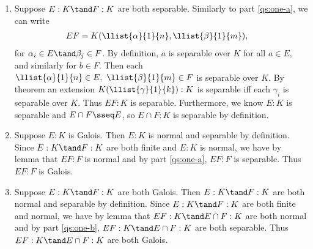 \documentclass{article}
\begin{document}
\begin{enumerate}[label=(\alph*)]
  \item \label{qs:one-b} \begin{solution}
    Suppose \( E:K\tand F:K \) are both separable.
    Similarly to part \ref{qs:one-a}, we can write \begin{align*}
      EF &= K(\llist{\alpha}{1}{n},\llist{\beta}{1}{m}),
    \end{align*}
    for \( \alpha_i\in E \tand \beta_j\in F \).
    By definition, \( a \) is separable over \( K \) for all \( a\in E \), and similarly for \( b\in F \).
    Then each \( \llist{\alpha}{1}{n}\in E,\ \llist{\beta}{1}{m}\in F \) is separable over \( K \).
    By theorem an extension \( K(\llist{\gamma}{1}{k}):K \) is separable iff each \( \gamma_i \) is separable over \( K \).
    Thus \( EF:K \) is separable.
    Furthermore, we know \( E:K \) is separable and \( E\cap F\sseq E \), so \( E\cap F:K \) is separable by definition.
  \end{solution}

  \item \begin{solution}
    Suppose \( E:K \) is Galois.
    Then \( E:K \) is normal and separable by definition.
    Since \( E:K\tand F:K \) are both finite and \( E:K \) is normal, we have by lemma that \( EF:F \) is normal and by part \ref{qs:one-a}, \( EF:F \) is separable.
    Thus \( EF:F \) is Galois.
  \end{solution}

  \item \begin{solution}
    Suppose \( E:K\tand F:K \) are both Galois.
    Then \( E:K\tand F:K \) are both normal and separable by definition.
    Since \( E:K\tand F:K \) are both finite and normal, we have by lemma that \( EF:K \tand  E\cap F:K \) are both normal and by part \ref{qs:one-b}, \( EF:K\tand E\cap F:K \) are both separable.
    Thus \( EF:K\tand E\cap F:K \) are both Galois.
  \end{solution}
\end{enumerate}
\end{document}
